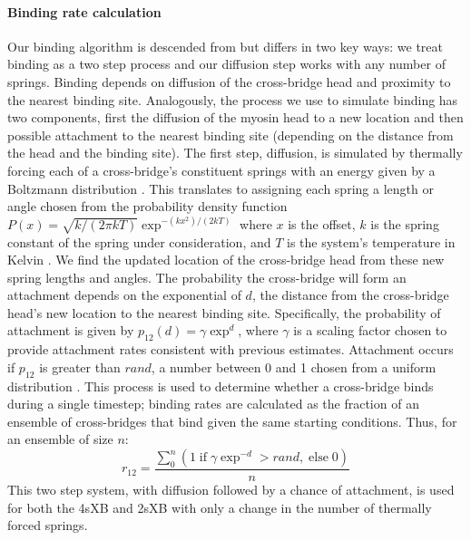 \documentclass[]{article}
\begin{document}
\paragraph{Binding rate calculation} %
Our binding algorithm is descended from \citet{Tanner2007} but differs in two key ways: we treat binding as a two step process and our diffusion step works with any number of springs.
Binding depends on diffusion of the cross-bridge head and proximity to the nearest binding site.
Analogously, the process we use to simulate binding has two components, first the diffusion of the myosin head to a new location and then possible attachment to the nearest binding site (depending on the distance from the head and the binding site).
The first step, diffusion, is simulated by thermally forcing each of a cross-bridge's constituent springs with an energy given by a Boltzmann distribution \citep{BergBook, HowardBook}.
This translates to assigning each spring a length or angle chosen from the probability density function $P(x) = \sqrt{k / (2 \pi kT)} \exp^{-(k x^2)/(2 kT)}$ where $x$ is the offset, $k$ is the spring constant of the spring under consideration, and $T$ is the system's temperature in Kelvin  \citep{DillBook, HowardBook}.
We find the updated location of the cross-bridge head from these new spring lengths and angles.
The probability the cross-bridge will form an attachment depends on the exponential of $d$, the distance from the cross-bridge head's new location to the nearest binding site.
Specifically, the probability of attachment is given by $p_{12}(d) = \gamma \exp ^{d}$, where $\gamma$ is a scaling factor chosen to provide attachment rates consistent with previous estimates.
Attachment occurs if $p_{12}$ is greater than $rand$, a number between 0 and 1 chosen from a uniform distribution \citep{Tanner2007}.
This process is used to determine whether a cross-bridge binds during a single timestep; binding rates are calculated as the fraction of an ensemble of cross-bridges that bind given the same starting conditions. 
Thus, for an ensemble of size $n$: 
$$r_{12} =  \frac{\sum_0^n \left( 1\; \textrm{if}\; \gamma \exp^{-d}>rand ,\; \textrm{else}\; 0 \right)}{n}$$
This two step system, with diffusion followed by a chance of attachment, is used for both the 4sXB and 2sXB with only a change in the number of thermally forced springs.
\end{document}
